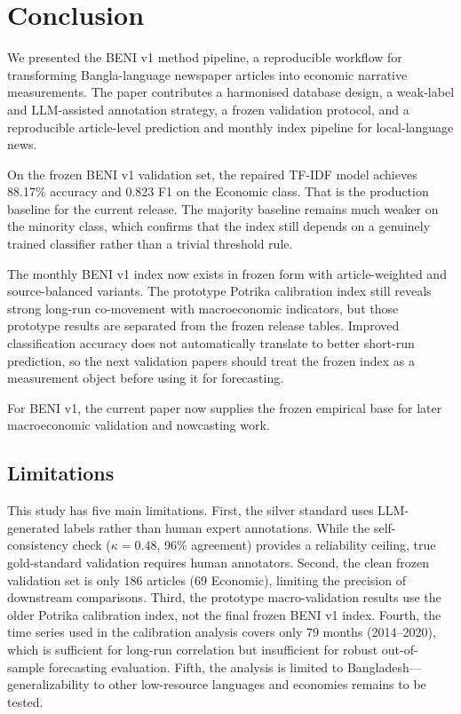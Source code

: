 
\section{Conclusion}\label{sec:conclusion}

We presented the BENI v1 method pipeline, a reproducible workflow for transforming Bangla-language newspaper articles into economic narrative measurements. The paper contributes a harmonised database design, a weak-label and LLM-assisted annotation strategy, a frozen validation protocol, and a reproducible article-level prediction and monthly index pipeline for local-language news.

On the frozen BENI v1 validation set, the repaired TF-IDF model achieves 88.17\% accuracy and 0.823 F1 on the Economic class. That is the production baseline for the current release. The majority baseline remains much weaker on the minority class, which confirms that the index still depends on a genuinely trained classifier rather than a trivial threshold rule.

The monthly BENI v1 index now exists in frozen form with article-weighted and source-balanced variants. The prototype Potrika calibration index still reveals strong long-run co-movement with macroeconomic indicators, but those prototype results are separated from the frozen release tables. Improved classification accuracy does not automatically translate to better short-run prediction, so the next validation papers should treat the frozen index as a measurement object before using it for forecasting.

For BENI v1, the current paper now supplies the frozen empirical base for later macroeconomic validation and nowcasting work.

\subsection{Limitations}

This study has five main limitations. First, the silver standard uses LLM-generated labels rather than human expert annotations. While the self-consistency check ($\kappa = 0.48$, 96\% agreement) provides a reliability ceiling, true gold-standard validation requires human annotators. Second, the clean frozen validation set is only 186 articles (69 Economic), limiting the precision of downstream comparisons. Third, the prototype macro-validation results use the older Potrika calibration index, not the final frozen BENI v1 index. Fourth, the time series used in the calibration analysis covers only 79 months (2014--2020), which is sufficient for long-run correlation but insufficient for robust out-of-sample forecasting evaluation. Fifth, the analysis is limited to Bangladesh---generalizability to other low-resource languages and economies remains to be tested.

